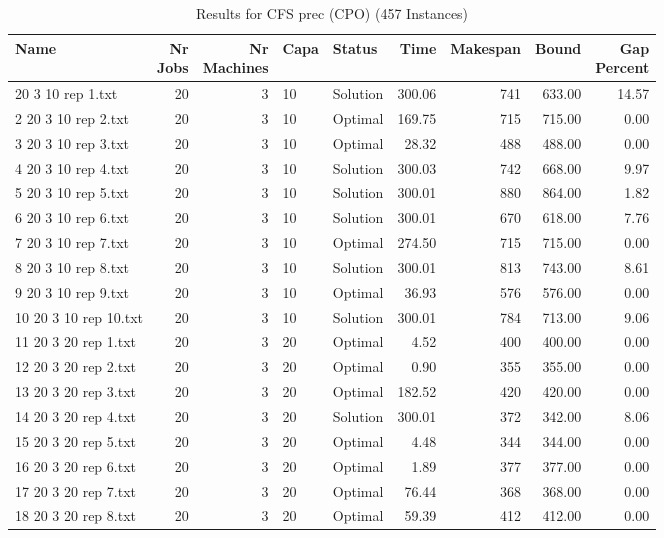 \begin{longtable}{lrrllrrrr}
\caption{Results for CFS prec (CPO) (457 Instances)}\\\toprule
Name & \shortstack{Nr\\Jobs} & \shortstack{Nr\\Machines} & Capa & Status  & Time & Makespan & Bound & \shortstack{Gap\\Percent}\\ \midrule
\endhead
\bottomrule
\endfoot
1 20 3 10 rep 1.txt & 20 & 3 & 10 & Solution & 300.06 & 741 & 633.00 & 14.57\\
2 20 3 10 rep 2.txt & 20 & 3 & 10 & Optimal & 169.75 & 715 & 715.00 &  0.00\\
3 20 3 10 rep 3.txt & 20 & 3 & 10 & Optimal & 28.32 & 488 & 488.00 &  0.00\\
4 20 3 10 rep 4.txt & 20 & 3 & 10 & Solution & 300.03 & 742 & 668.00 &  9.97\\
5 20 3 10 rep 5.txt & 20 & 3 & 10 & Solution & 300.01 & 880 & 864.00 &  1.82\\
6 20 3 10 rep 6.txt & 20 & 3 & 10 & Solution & 300.01 & 670 & 618.00 &  7.76\\
7 20 3 10 rep 7.txt & 20 & 3 & 10 & Optimal & 274.50 & 715 & 715.00 &  0.00\\
8 20 3 10 rep 8.txt & 20 & 3 & 10 & Solution & 300.01 & 813 & 743.00 &  8.61\\
9 20 3 10 rep 9.txt & 20 & 3 & 10 & Optimal & 36.93 & 576 & 576.00 &  0.00\\
10 20 3 10 rep 10.txt & 20 & 3 & 10 & Solution & 300.01 & 784 & 713.00 &  9.06\\
11 20 3 20 rep 1.txt & 20 & 3 & 20 & Optimal &  4.52 & 400 & 400.00 &  0.00\\
12 20 3 20 rep 2.txt & 20 & 3 & 20 & Optimal &  0.90 & 355 & 355.00 &  0.00\\
13 20 3 20 rep 3.txt & 20 & 3 & 20 & Optimal & 182.52 & 420 & 420.00 &  0.00\\
14 20 3 20 rep 4.txt & 20 & 3 & 20 & Solution & 300.01 & 372 & 342.00 &  8.06\\
15 20 3 20 rep 5.txt & 20 & 3 & 20 & Optimal &  4.48 & 344 & 344.00 &  0.00\\
16 20 3 20 rep 6.txt & 20 & 3 & 20 & Optimal &  1.89 & 377 & 377.00 &  0.00\\
17 20 3 20 rep 7.txt & 20 & 3 & 20 & Optimal & 76.44 & 368 & 368.00 &  0.00\\
18 20 3 20 rep 8.txt & 20 & 3 & 20 & Optimal & 59.39 & 412 & 412.00 &  0.00\\

\end{longtable}
